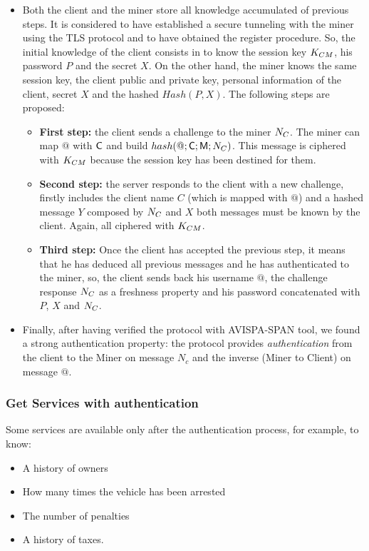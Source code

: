 \begin{itemize}
  \item Both the client and the miner store all knowledge accumulated
    of previous steps. It is considered to have established a secure tunneling 
    with the miner using the TLS protocol and to have obtained the register
    procedure. So, the initial knowledge of the client consists in to know 
    the session key $K_{CM}$, his password $P$ and the secret $X$. 
    On the other hand, the miner knows the same session key, the client public and
    private key, personal information of the client, secret $X$ and the hashed 
    $Hash(P,X)$. The following steps are proposed:
    \begin{itemize}
    \item \textbf{First step:} the client sends a challenge to the
      miner $N_C$. The miner can map $@$ with $\textsf{C}$ and build $hash(@;\textsf{C};\textsf{M}; N_C)$. This message is ciphered with $K_{CM}$ because the session key has been destined for them. 
    \item \textbf{Second step:} the server responds to the client with a new challenge,
      firstly includes the client name $C$ (which is mapped with $@$) and a hashed message
      $Y$ composed by $N_{C}$ and $X$ both messages must be known by the client. Again,
      all ciphered with $K_{CM}$.
    \item \textbf{Third step:} Once the client has accepted the previous step, it means that
      he has deduced all previous messages and he has authenticated to the miner, so, the 
      client sends back his username $@$, the challenge response $N_C$ as a freshness
      property and his password concatenated with $P$, $X$ and $N_{C}$.
  \end{itemize}
\item Finally, after having verified the protocol with AVISPA-SPAN tool, we found a strong authentication property: the protocol provides \emph{authentication} from the client to the Miner on message $N_c$ and the inverse (Miner to Client) on message $@$. 
\end{itemize}
 


\subsubsection{Get Services with authentication}
\label{ssec:getServAuth}
Some services are available only after the authentication process, for example, to know:
\begin{itemize}
    \item A history of owners
    \item How many times the vehicle has been arrested 
    \item The number of penalties
    \item A history of taxes.
\end{itemize}


